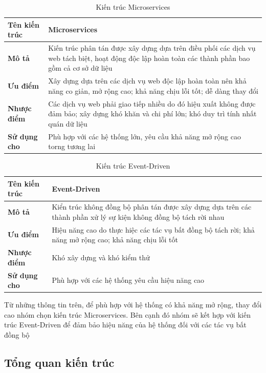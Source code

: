 \begin{table}
	\begin{tabular}{|p{3cm}|p{12cm}|}
		\hline
		\textbf{Tên kiến trúc} & Microservices\\
		\hline
		\textbf{Mô tả}         & Kiến trúc phân tán được xây dựng dựa trên điều phối các dịch vụ web tách biệt, hoạt động độc lập hoàn toàn các thành phần bao gồm cả cơ sở dữ liệu    \\
		\hline
		\textbf{Ưu điểm}       & Xây dựng dựa trên các dịch vụ web độc lập hoàn toàn nên khả năng co giản, mở rộng cao; khả năng chịu lỗi tốt; dễ dàng thay đổi\\
		\hline
		\textbf{Nhược điểm}    & Các dịch vụ web phải giao tiếp nhiều do đó hiệu xuất không được đảm bảo; xây dựng khó khăn và chi phí lớn; khó duy trì tính nhất quán dữ liệu \\
		\hline
		\textbf{Sử dụng cho}   & Phù hợp với các hệ thống lớn, yêu cầu khả năng mở rộng cao torng tương lai                  \\
		\hline
	\end{tabular}
	\caption{Kiến trúc Microservices}
\end{table}

\begin{table}
	\begin{tabular}{|p{3cm}|p{12cm}|}
		\hline
		\textbf{Tên kiến trúc} & Event-Driven\\
		\hline
		\textbf{Mô tả}         & Kiển trúc không đồng bộ phân tán được xây dựng dựa trên các thành phần xử lý sự kiện không đồng bộ tách rời nhau \\
		\hline
		\textbf{Ưu điểm}       & Hiệu năng cao do thực hiệc các tác vụ bất đồng bộ tách rời; khả năng mở rộng cao; khả năng chịu lỗi tốt \\
		\hline
		\textbf{Nhược điểm}    & Khó xây dựng và khó kiểm thử \\
		\hline
		\textbf{Sử dụng cho}   & Phù hợp với các hệ thống yêu cầu hiệu năng cao \\
		\hline
	\end{tabular}
	\caption{Kiến trúc Event-Driven}
\end{table}

Từ những thông tin trên, để phù hợp với hệ thống có khả năng mở rộng, thay đổi cao nhóm chọn kiến trúc Microservices. Bên cạnh đó nhóm sẽ kết hợp với kiến trúc Event-Driven để đảm bảo hiệu năng của hệ thống đối với các tác vụ bất đồng bộ


\subsection{Tổng quan kiến trúc}

